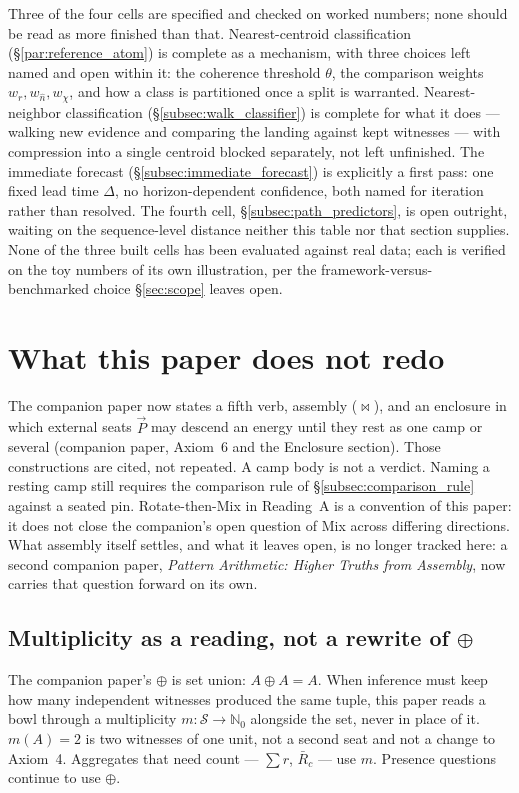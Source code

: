 \documentclass[12pt, a4paper]{article}
\begin{document}
Three of the four cells are specified and checked on worked numbers;
none should be read as more finished than that. Nearest-centroid
classification (\S\ref{par:reference_atom}) is complete as a
mechanism, with three choices left named and open within it: the
coherence threshold $\theta$, the comparison weights
$w_r,w_{\hat n},w_\chi$, and how a class is partitioned once a split
is warranted. Nearest-neighbor classification
(\S\ref{subsec:walk_classifier}) is complete for what it does ---
walking new evidence and comparing the landing against kept
witnesses --- with compression into a single centroid blocked
separately, not left unfinished. The immediate forecast
(\S\ref{subsec:immediate_forecast}) is explicitly a first pass: one
fixed lead time $\Delta$, no horizon-dependent confidence, both named
for iteration rather than resolved. The fourth cell,
\S\ref{subsec:path_predictors}, is open outright, waiting on the
sequence-level distance neither this table nor that section
supplies. None of the three built cells has been evaluated against
real data; each is verified on the toy numbers of its own
illustration, per the framework-versus-benchmarked choice
\S\ref{sec:scope} leaves open.


\section{What this paper does not redo}
\label{sec:not_redo}

The companion paper now states a fifth verb, assembly ($\bowtie$),
and an enclosure in which external seats $\vec P$ may descend an
energy until they rest as one camp or several
(companion paper, Axiom~6 and the Enclosure section). Those
constructions are cited, not repeated. A camp body is not a verdict.
Naming a resting camp still requires the comparison rule of
\S\ref{subsec:comparison_rule} against a seated pin. Rotate-then-Mix
in Reading~A is a convention of this paper: it does not close the
companion's open question of Mix across differing directions. What
assembly itself settles, and what it leaves open, is no longer
tracked here: a second companion paper, \emph{Pattern Arithmetic:
Higher Truths from Assembly}, now carries that question forward on
its own.

\subsection{Multiplicity as a reading, not a rewrite of $\oplus$}
\label{subsec:multiplicity_reading}
The companion paper's $\oplus$ is set union: $A\oplus A=A$. When
inference must keep how many independent witnesses produced the same
tuple, this paper reads a bowl through a multiplicity
$m:\mathcal{S}\to\mathbb{N}_0$ alongside the set, never in place of
it. $m(A)=2$ is two witnesses of one unit, not a second seat and not
a change to Axiom~4. Aggregates that need count --- $\sum r$,
$\bar R_c$ --- use $m$. Presence questions continue to use $\oplus$.
\end{document}
